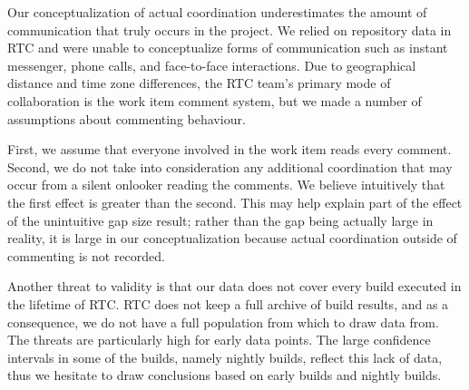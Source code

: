
Our conceptualization of actual coordination underestimates the amount of communication that truly occurs in the project. 
We relied on repository data in RTC and were unable to conceptualize forms of communication such as instant messenger, phone calls, and face-to-face interactions.
Due to geographical distance and time zone differences, the RTC team's primary mode of collaboration is the work item comment system, but we made a number of assumptions about commenting behaviour.

First, we assume that everyone involved in the work item reads every comment. Second, we do not take into consideration any additional coordination that may occur from a silent onlooker reading the comments. We believe intuitively that the first effect is greater than the second.
This may help explain part of the effect of the unintuitive gap size result; rather than the gap being actually large in reality, it is large in our conceptualization because actual coordination outside of commenting is not recorded.


Another threat to validity is that our data does not cover every build executed in the lifetime of RTC. RTC does not keep a full archive of build results, and as a consequence, we do not have a full population from which to draw data from. The threats are particularly high for early data points. The large confidence intervals in some of the builds, namely nightly builds, reflect this lack of data, thus we hesitate to draw conclusions based on early builds and nightly builds.


